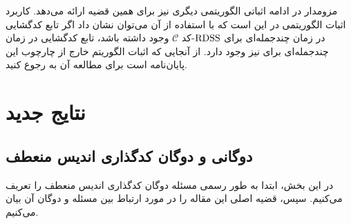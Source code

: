  مزومدار در ادامه اثباتی الگوریتمی دیگری نیز برای همین قضیه ارائه می‌دهد. کاربرد اثبات الگوریتمی در این است که با استفاده از آن می‌توان نشان داد اگر تابع کدگشایی در زمان چندجمله‌ای برای 
 $\mathrm{RDSS}$-کد
 $\mathcal{C}$
 وجود داشته باشد، تابع کدگشایی در زمان چندجمله‌ای برای
 \icod
 نیز وجود دارد. از آنجایی که اثبات الگوریتم خارج از چارچوب این پایان‌نامه است برای مطالعه آن به
 \cite{arya}
 رجوع کنید.
 \newpage
\section{نتایج جدید}
\label{sec3}
\subsection{
	دوگانی
	\picod
	 و دوگان کدگذاری اندیس منعطف
}
در این بخش، ابتدا به طور رسمی مسئله دوگان کدگذاری اندیس منعطف را تعریف می‌کنیم. سپس، قضیه اصلی این مقاله را در مورد ارتباط بین مسئله 
\picod
 و دوگان آن بیان می‌کنیم.
